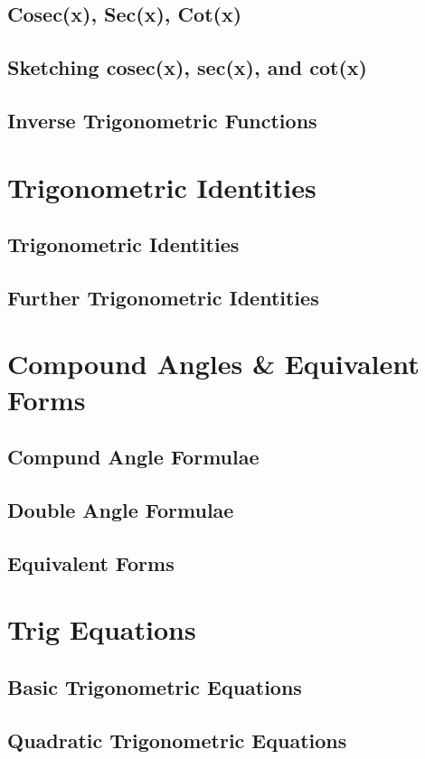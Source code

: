 \documentclass[../maths.tex]{subfiles}
\begin{document}
\subsection*{Cosec(x), Sec(x), Cot(x)}
\subsection*{Sketching cosec(x), sec(x), and cot(x)}
\subsection*{Inverse Trigonometric Functions}
\section{Trigonometric Identities}
\subsection*{Trigonometric Identities}
\subsection*{Further Trigonometric Identities}
\section{Compound Angles \& Equivalent Forms}
\subsection*{Compund Angle Formulae}
\subsection*{Double Angle Formulae}
\subsection*{Equivalent Forms}
\section{Trig Equations}
\subsection*{Basic Trigonometric Equations}
\subsection*{Quadratic Trigonometric Equations}
\end{document}
